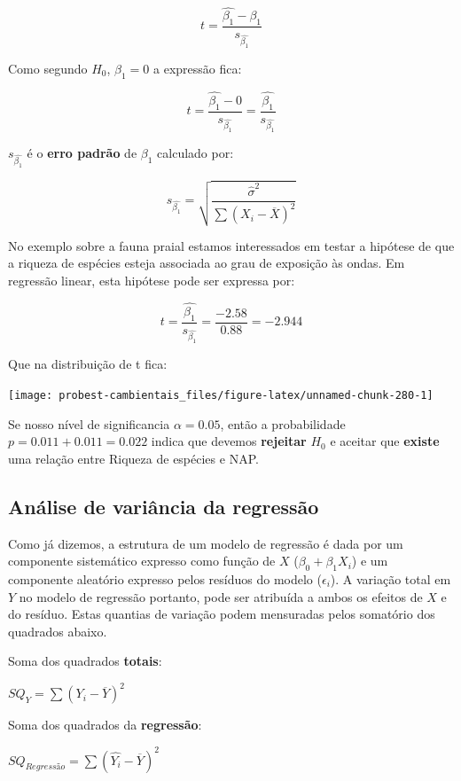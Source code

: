 \documentclass[
]{book}
\begin{document}
\[t = \frac{\hat{\beta_1} - \beta_1}{s_{\hat{\beta_1}}}\]

Como segundo \(H_0\), \(\beta_1 = 0\) a expressão fica:

\[t = \frac{\hat{\beta_1} - 0}{s_{\hat{\beta_1}}} = \frac{\hat{\beta_1}}{s_{\hat{\beta_1}}}\]

\(s_{\hat{\beta_1}}\) é o \textbf{erro padrão} de \(\beta_1\) calculado por:

\[s_{\hat{\beta_1}} = \sqrt{\frac{\hat{\sigma}^2}{\sum{(X_i-\overline{X})^2}}}\]

No exemplo sobre a fauna praial estamos interessados em testar a hipótese de que a riqueza de espécies esteja associada ao grau de exposição às ondas. Em regressão linear, esta hipótese pode ser expressa por:

\[t = \frac{\hat{\beta_1}}{s_{\hat{\beta_1}}} = \frac{-2.58}{0.88} = -2.944\]

Que na distribuição de t fica:

\begin{center}\texttt{[image: probest-cambientais\_files/figure-latex/unnamed-chunk-280-1]} \end{center}

Se nosso nível de significancia \(\alpha = 0.05\), então a probabilidade \(p = 0.011 + 0.011 = 0.022\) indica que devemos \textbf{rejeitar} \(H_0\) e aceitar que \textbf{existe} uma relação entre Riqueza de espécies e NAP.

\hypertarget{anuxe1lise-de-variuxe2ncia-da-regressuxe3o}{%
\subsection{Análise de variância da regressão}\label{anuxe1lise-de-variuxe2ncia-da-regressuxe3o}}

Como já dizemos, a estrutura de um modelo de regressão é dada por um componente sistemático expresso como função de \(X\) (\(\beta_0 + \beta_1X_i\)) e um componente aleatório expresso pelos resíduos do modelo (\(\epsilon_i\)). A variação total em \(Y\) no modelo de regressão portanto, pode ser atribuída a ambos os efeitos de \(X\) e do resíduo. Estas quantias de variação podem mensuradas pelos somatório dos quadrados abaixo.

Soma dos quadrados \textbf{totais}:

\(SQ_Y = \sum{(Y_i - \overline{Y})^2}\)

Soma dos quadrados da \textbf{regressão}:

\(SQ_{Regressão}= \sum{(\hat{Y_i} - \overline{Y})^2}\)
\end{document}

